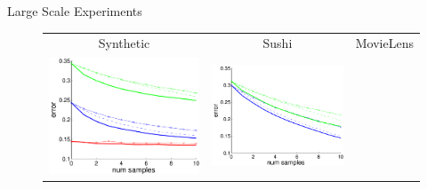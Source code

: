 \documentclass[final]{beamer}
\newlength{\onecolwid}
\begin{document}
\begin{frame}[t]
\begin{columns}[t]
\begin{column}{\onecolwid}
\begin{block}{Large Scale Experiments}
          \vskip-0.2cm
          
          \begin{figure}[h!]
          \centering
          \begin{tabular}{ccc}
          Synthetic&
          Sushi&
          MovieLens\\
          \includegraphics[scale=0.7]{figs/error_syntheticDataLargeScale.pdf}&
          \includegraphics[scale=0.7]{figs/error_sushiDataLargeScale.pdf}&

\end{tabular}
\end{figure}
\end{block}
\end{column}
\end{columns}
\end{frame}
\end{document}
